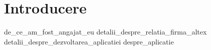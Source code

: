 \chapter*{Introducere}
{de_ce_am_fost_angajat_eu}
{detalii_despre_relatia_firma_altex}
{detalii_despre_dezvoltarea_aplicatiei}
{despre_aplicatie}
